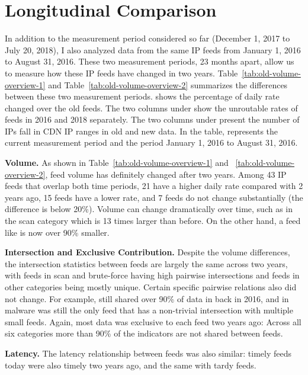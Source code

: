 \section{Longitudinal Comparison}
\label{sec:new_vs_old}

In addition to the measurement period considered so far (December 1, 2017 to July 20, 2018), I also analyzed data from the same IP feeds from January 1, 2016 to August 31, 2016. These two measurement periods, 23 months apart, allow us to measure how these IP feeds have changed in two years. Table~\ref{tab:old-volume-overview-1} and
Table~\ref{tab:old-volume-overview-2} summarizes the differences between these two measurement periods.  shows the percentage of daily rate changed over the old feeds.
The two columns under  show the unroutable rates of feeds in 2016 and 2018 separately. The two columns under  present the number of IPs fall in CDN IP ranges in old and new data. In the table,  represents the current measurement period and  the period  January 1, 2016 to August 31, 2016.


\noindent\textbf{Volume.}
As shown in Table~\ref{tab:old-volume-overview-1} and ~\ref{tab:old-volume-overview-2}, feed volume has definitely changed after two years. Among 43 IP feeds that overlap both time periods,
21 have a higher daily rate compared with 2 years ago, 15 feeds
have a lower rate, and 7 feeds do not change substantially (the difference is below 20\%).
Volume can change dramatically over time, such as {\feedTSAlienVault}
in the scan category which is 13 times larger than before. On the other hand, a feed like {\feedTSBots} is now over 90\% smaller.

\noindent\textbf{Intersection and Exclusive Contribution.}
Despite the volume differences, the intersection statistics between feeds are largely the same across two years,
with feeds in scan and brute-force having high pairwise intersections and
feeds in other categories being mostly unique. Certain specific pairwise relations also did not change.
For example, {\feedbadipssh} still shared over 90\% of data in {\feeddangerrule} back in 2016, and {\feedetiprep} in malware
was still the only feed that has a non-trivial intersection with multiple small feeds.
Again, most data was exclusive to each feed two years ago: Across all
six categories more than 90\% of the indicators are not shared between feeds.

\noindent\textbf{Latency.}
The latency relationship between feeds was also similar:
timely feeds today were also timely two years ago, and the same with tardy feeds.


